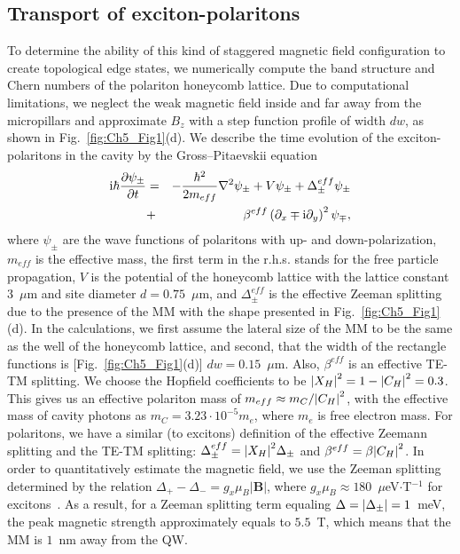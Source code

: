 \subsection{Transport of exciton-polaritons }
To determine the ability of this kind of staggered magnetic field configuration to create topological edge states, we numerically compute the band structure and Chern numbers of the polariton honeycomb lattice.
Due to computational limitations, we neglect the weak magnetic field inside and far away from the micropillars and approximate $B_z$ with a step function profile of width $dw$, as shown in Fig.~\ref{fig:Ch5_Fig1}(d).
%
We describe the time evolution of the exciton-polaritons in the cavity by the Gross--Pitaevskii equation
%
\begin{eqnarray}
    \label{eq:Ch5_EOM}
    \mathrm{i}\hbar \frac{\partial \psi_{\pm}}{\partial t} &=& -\frac{\hbar^2}{2m_{eff}}\nabla^2 \psi_{\pm} + V \psi_{\pm} + \Delta_{\pm}^{eff} \psi_{\pm} \nonumber \\
    &+& \beta^{eff} \left( \partial_x \mp \mathrm{i} \partial_y \right)^2 \psi_\mp, \label{eq:Ch5_GPE}
\end{eqnarray}
%
where $\psi_\pm$ are the wave functions of polaritons with up- and down-polarization, $m_{eff}$ is the effective mass, the first term in the r.h.s. stands for the free particle propagation, $V$ is the potential of the honeycomb lattice with the lattice constant $3$~$\mu$m and site diameter $d = 0.75$~$\mu$m, and $\Delta^{eff}_\pm$ is the effective Zeeman splitting due to the presence of the MM with the shape presented in Fig.~\ref{fig:Ch5_Fig1}(d).
In the calculations, we first assume the lateral size of the MM to be the same as the well of the honeycomb lattice, and second, that the width of the rectangle functions is [Fig.~\ref{fig:Ch5_Fig1}(d)] $dw = 0.15$~$ \mu$m. Also, $\beta^{eff}$ is an effective TE-TM splitting.
We choose the Hopfield coefficients to be $\abs{X_H}^2 = 1 - \abs{C_H}^2 = 0.3$.
This gives us an effective polariton mass of $m_{eff} \approx m_C/\abs{C_H}^2$, with the effective mass of cavity photons as $m_C =3.23\cdot10^{-5}m_e$, where $m_e$ is free electron mass.
For polaritons, we have a similar (to excitons) definition of the effective Zeemann splitting and the TE-TM splitting: $\Delta_\pm^{eff} = \abs{X_H}^2 \Delta_\pm$ and $\beta^{eff} = \beta \abs{C_H}^2$.
In order to quantitatively estimate the magnetic field, we use the Zeeman splitting determined by the relation $\Delta_+-\Delta_- = g_x \mu_B |\mathbf{B}|$, where $g_x \mu_B\approx 180$~$\mu$eV$\cdot$T$^{-1}$ for excitons~\cite{Schneider:2013aa}.
As a result, for a Zeeman splitting term equaling $\Delta = \abs{\Delta_\pm}=1$~meV, the peak magnetic strength approximately equals to $5.5$~T, which means that the MM is $1$~nm away from the QW.


